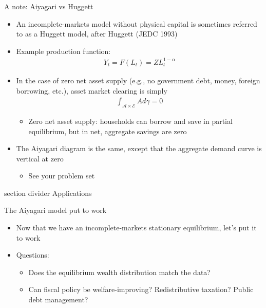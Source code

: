 \documentclass[9pt]{beamer}
\newcommand{\sectiondivider}[1]{
	\begin{frame}[plain]
		\vfill
		\begin{beamercolorbox}[wd=.84\textwidth,sep=1.1em,center,rounded=true]{section divider}
			{\usebeamerfont{section title} #1}
		\end{beamercolorbox}
		\vfill
	\end{frame}
}
\newcommand{\bit}{\begin{itemize}}
\newcommand{\eit}{\end{itemize}}
\begin{document}
%
%
%
%
%


\begin{frame}{A note: Aiyagari vs Huggett}

\bit
\setlength\itemsep{1.5em}

\item An incomplete-markets model without physical capital is sometimes referred to as a Huggett model, after Huggett (JEDC 1993)

\item Example production function:
\begin{eqnarray}
Y_t = F(L_t) = Z L_t^{1-\alpha} \nonumber
\end{eqnarray}

\item In the case of zero net asset supply (e.g., no government debt, money, foreign borrowing, etc.), asset market clearing is simply
\begin{eqnarray}
\int_{\bm{\mathcal A} \times \bm{\mathcal E}} A d\gamma \nonumber = 0 \nonumber
\end{eqnarray}
\bit
	\item Zero net asset supply: households can borrow and save in partial equilibrium, but in net, aggregate savings are zero 
\eit

\item The Aiyagari diagram is the same, except that the aggregate demand curve is vertical at zero
\bit
	\item See your problem set
\eit

\eit

\end{frame}

\sectiondivider{Applications}

\begin{frame}{The Aiyagari model put to work}

\bit
\setlength\itemsep{2em}

\item Now that we have an incomplete-markets stationary equilibrium, let's put it to work

\item Questions:
\bit
\setlength\itemsep{0.5em}

	\item Does the equilibrium wealth distribution match the data?
	
	\item Can fiscal policy be welfare-improving? Redistributive taxation? Public debt management?
\eit

\eit

\end{frame}
\end{document}
